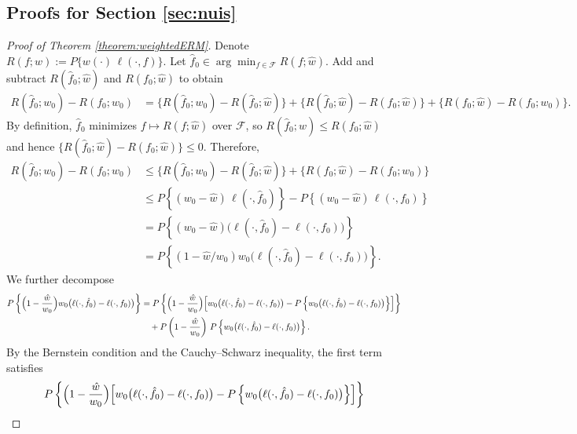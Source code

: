 \documentclass[11pt]{article}
\theoremstyle{plain}
\theoremstyle{definition} %
\begin{document}
\subsection{Proofs for Section  \ref{sec:nuis}}



\begin{proof}[Proof of Theorem \ref{theorem:weightedERM}]
Denote $R(f;w) := P\{w(\cdot)\,\ell(\cdot,f)\}$. Let $\hat f_0 \in \arg\min_{f\in\mathcal F} R(f;\hat w)$.  Add and subtract
$R(\hat f_0;\hat w)$ and $R(f_0;\hat w)$ to obtain
\begin{align*}
R(\hat f_0;w_0)-R(f_0;w_0)
&=
\bigl\{R(\hat f_0;w_0)-R(\hat f_0;\hat w)\bigr\}
+
\bigl\{R(\hat f_0;\hat w)-R(f_0;\hat w)\bigr\}
+
\bigl\{R(f_0;\hat w)-R(f_0;w_0)\bigr\}.
\end{align*}
By definition, $\hat f_0$ minimizes $f\mapsto R(f;\hat w)$ over $\mathcal F$, so
$R(\hat f_0;\hat w)\le R(f_0;\hat w)$ and hence
$\bigl\{R(\hat f_0;\hat w)-R(f_0;\hat w)\bigr\}\le 0$. Therefore,
\begin{align*}
R(\hat f_0;w_0)-R(f_0;w_0)
&\le
\bigl\{R(\hat f_0;w_0)-R(\hat f_0;\hat w)\bigr\}
+
\bigl\{R(f_0;\hat w)-R(f_0;w_0)\bigr\}\\
&\le
P\left\{(w_0-\hat w)\,\ell(\cdot,\hat f_0)\right\}
-
P\left\{(w_0-\hat w)\,\ell(\cdot,f_0)\right\}\\
&=
P\left\{(w_0-\hat w)\bigl(\ell(\cdot,\hat f_0)-\ell(\cdot,f_0)\bigr)\right\}\\
&=
P\left\{(1-\hat w/w_0)w_0\bigl(\ell(\cdot,\hat f_0)-\ell(\cdot,f_0)\bigr)\right\}.
\end{align*}
We further decompose
\begin{align*}
P\left\{\Bigl(1-\frac{\hat w}{w_0}\Bigr) w_0\bigl(\ell(\cdot,\hat f_0)-\ell(\cdot,f_0)\bigr)\right\}
&=
P\left\{\Bigl(1-\frac{\hat w}{w_0}\Bigr)\Bigl[w_0\bigl(\ell(\cdot,\hat f_0)-\ell(\cdot,f_0)\bigr)
- P\left\{w_0\bigl(\ell(\cdot,\hat f_0)-\ell(\cdot,f_0)\bigr)\right\}\Bigr]\right\}\\
&\quad+
P\left(1-\frac{\hat w}{w_0}\right)\,
P\left\{w_0\bigl(\ell(\cdot,\hat f_0)-\ell(\cdot,f_0)\bigr)\right\}.
\end{align*}
By the Bernstein condition and the Cauchy--Schwarz inequality, the first term satisfies
\begin{align*}
&P\left\{\Bigl(1-\frac{\hat w}{w_0}\Bigr)\Bigl[w_0\bigl(\ell(\cdot,\hat f_0)-\ell(\cdot,f_0)\bigr)
- P\left\{w_0\bigl(\ell(\cdot,\hat f_0)-\ell(\cdot,f_0)\bigr)\right\}\Bigr]\right\} \\

\end{align*}
\end{proof}
\end{document}
